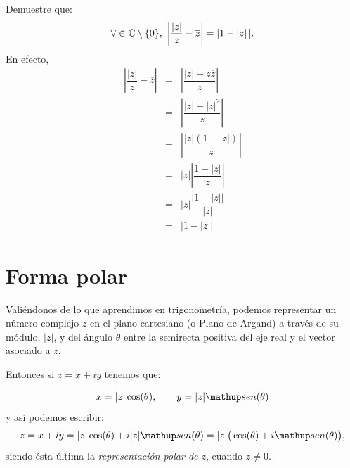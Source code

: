 \begin{ejercicio}
Demuestre que:
$$\forall \in\mathbb{C}\setminus\{0\},\ \left|\dfrac{|z|}{z}-\overline{z}\right|=|1-|z|\, |.$$
En efecto, 
\begin{eqnarray*}
\left|\dfrac{|z|}{z}-\overline{z}\right|&=&\left|\dfrac{|z|-z\overline{z}}{z}\right|\\
&=&\left|\dfrac{|z|-|z|^2}{z}\right|\\
&=&\left|\dfrac{|z|(1-|z|)}{z}\right|\\
&=&|z|\left|\dfrac{1-|z|}{z}\right|\\
&=&|z|\dfrac{|1-|z||}{|z|}\\
&=&|1-|z| |
\end{eqnarray*}
\end{ejercicio}


%
%

\section{Forma polar}

Valiéndonos de lo que aprendimos en trigonometría, podemos representar un número complejo $z$ en el plano cartesiano (o Plano de Argand) a través de su módulo, $|z|$, y del ángulo $\theta$ entre la semirecta positiva
del eje real y el vector asociado a $z$.

\begin{center}
\end{center}

Entonces si $z=x+iy$ tenemos que:

\[
    x = |z| \cos(\theta),\qquad y = |z| \sen(\theta)
\]
y as\'i podemos escribir:
\begin{equation}\label{polar1}
    z = x + i y = |z| \cos(\theta) + i |z| \sen(\theta) = |z| \big(\cos(\theta) + i \sen(\theta)\big),
\end{equation}
siendo \'esta \'ultima la {\em representaci\'on
polar de $z$}, cuando $z \ne 0$.

